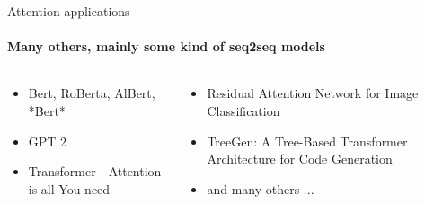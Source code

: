 \documentclass{beamer}
\begin{document}
\begin{frame}{Attention applications}
\framesubtitle{Many others, mainly some kind of seq2seq models}

\begin{columns}
\begin{column}{0.5\textwidth}
    \begin{itemize}
    \item Bert\cite{bert}, RoBerta\cite{roberta}, AlBert\cite{albert}, *Bert*
    
    \item GPT 2\cite{gpt2}
    
    \item Transformer - Attention is all You need\cite{attention-is-all-you-need} 
    
    \end{itemize}   
\end{column}
\begin{column}{0.5\textwidth}
    \begin{itemize}
    \item Residual Attention Network for Image Classification\cite{res-attention}
    
    \item TreeGen: A Tree-Based Transformer Architecture for Code Generation\cite{treegen}
    
    \item and many others ...
    
    
    \end{itemize} 

\end{column}
\end{columns}
    
\end{frame}
\end{document}
